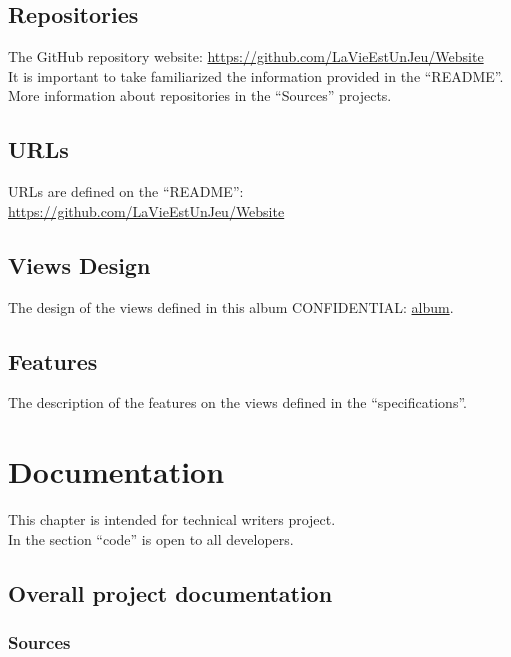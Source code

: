 \documentclass{life-fr}
\begin{document}
\section{Repositories}

The GitHub repository website:
\url{https://github.com/LaVieEstUnJeu/Website} \\
It is important to take familiarized the information provided in the
``README''.\\
More information about repositories in the ``Sources'' projects.

\section{URLs}

URLs are defined on the ``README'':
\url{https://github.com/LaVieEstUnJeu/Website}

\section{Views Design}

The design of the views defined in this album CONFIDENTIAL:
\href{http://photos.db0.fr/?album=GLifeDesign?authkey=Gv1sRgCLmfvp7DmMK_hAE}{album}.

\section{Features}

The description of the features on the views defined in the ``specifications''.


\chapter{Documentation}

This chapter is intended for technical writers project.\\
In the section ``code'' is open to all developers.

\section{Overall project documentation}

\subsection{Sources}
\end{document}

